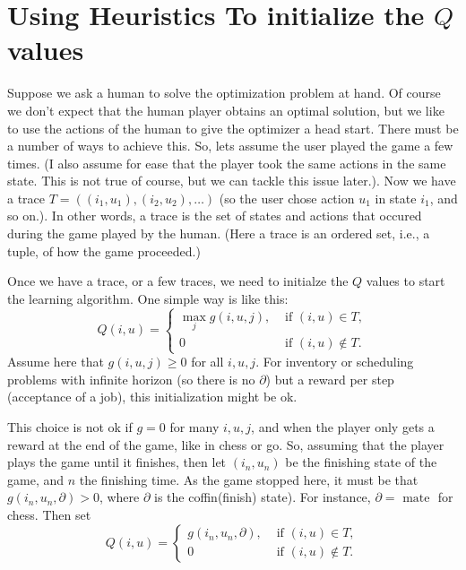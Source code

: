 \documentclass{article}
\begin{document}
\section{Using Heuristics To initialize the $Q$ values}
\label{sec:using-heuristics-as}

Suppose we ask a human to solve the optimization problem at hand. Of course we don't expect that the human player obtains an optimal solution, but we like to use the actions of the human to give the optimizer a head start. There must  be a number of ways to achieve this. So, lets assume the user played the game a few times. (I also assume for ease that the player took the same actions in the same state. This is not true of course, but we can tackle this issue later.). Now we have a trace $T = ((i_1,u_1), (i_2,u_2),\ldots)$ (so the user chose action $u_1$ in state $i_1$, and so on.). In other words, a trace is the set of states and actions that occured during the game played by the human.  (Here a trace is an ordered set, i.e., a tuple, of how the game proceeded.)

Once we have a trace, or a few traces, we need to initialze the $Q$ values to start the learning algorithm. One simple way is like this: 
\begin{equation*}
  Q(i,u) = 
  \begin{cases}
    \max_j g(i,u,j),  &\text{ if } (i,u) \in T, \\
    0  &\text{ if } (i,u) \not \in T.
  \end{cases}
\end{equation*}
Assume here that $g(i,u,j)\geq 0$ for all $i, u, j$.  For inventory or scheduling problems with infinite horizon (so there is no $\partial$) but a reward per step (acceptance of a job), this initialization might be ok. 

This choice is not ok if $g=0$ for many $i,u,j$, and when the player only gets a reward at the end of the game, like in chess or go. So, assuming that the player plays the game until it finishes,  then let $(i_n, u_n)$ be the finishing  state of the game, and $n$ the finishing time. As the game stopped here, it must be that $g(i_n, u_n, \partial)>0$, where $\partial$ is the coffin(finish) state). For instance, $\partial = \text{ mate }$ for chess. Then set 
\begin{equation*}
  Q(i,u) = 
  \begin{cases}
    g(i_n,u_n,\partial),  &\text{ if } (i,u) \in T, \\
    0  &\text{ if } (i,u) \not \in T.
  \end{cases}
\end{equation*}
\end{document}

